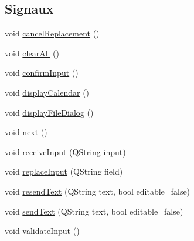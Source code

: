 \subsection*{Signaux}
\begin{DoxyCompactItemize}
\item 
void \hyperlink{classSH__InOutStateMachine_a67ce246a765ad91fef76f70ece12213f}{cancel\-Replacement} ()
\item 
void \hyperlink{classSH__InOutStateMachine_ad722deb53285919796b04db5af6e51b4}{clear\-All} ()
\item 
void \hyperlink{classSH__InOutStateMachine_a0fb4c4d63ccb19df48f1e060d02d8ae3}{confirm\-Input} ()
\item 
void \hyperlink{classSH__InOutStateMachine_a0d241868828cbf9798233a8c74c69851}{display\-Calendar} ()
\item 
void \hyperlink{classSH__InOutStateMachine_aeddfbc098f5ee8ac05eadbaf37803fb1}{display\-File\-Dialog} ()
\item 
void \hyperlink{classSH__InOutStateMachine_aa9ee51efe0e17dcf5366c8a97b523892}{next} ()
\item 
void \hyperlink{classSH__InOutStateMachine_ab224e4a6ab99c15770bc63e1b8fdb771}{receive\-Input} (Q\-String input)
\item 
void \hyperlink{classSH__InOutStateMachine_af5f82970faef3bca48a147863dba2ee1}{replace\-Input} (Q\-String field)
\item 
void \hyperlink{classSH__InOutStateMachine_a526822c66b46aa0cd81ba4473fa5573f}{resend\-Text} (Q\-String text, bool editable=false)
\item 
void \hyperlink{classSH__InOutStateMachine_ae2cbbe3cd207158668dcb4838938c7ad}{send\-Text} (Q\-String text, bool editable=false)
\item 
void \hyperlink{classSH__InOutStateMachine_a5a5804bd32a04d25926f6e323b906887}{validate\-Input} ()
\end{DoxyCompactItemize}

